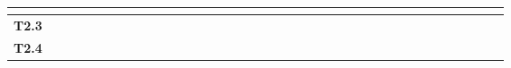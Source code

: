 \begin{table}[h]
{\begin{tabular}{|l|llllllllllll|llllllllllll|llllllllllll|}
  \multicolumn{1}{l|}{\cellcolor[HTML]{FBD4B4}} &
  \multicolumn{1}{l|}{\cellcolor[HTML]{FBD4B4}} &
  \multicolumn{1}{l|}{\cellcolor[HTML]{FBD4B4}} &
  \multicolumn{1}{l|}{\cellcolor[HTML]{FBD4B4}} &
  \multicolumn{1}{l|}{\cellcolor[HTML]{FBD4B4}} &
  \multicolumn{1}{l|}{\cellcolor[HTML]{FBD4B4}} &
  \multicolumn{1}{l|}{\cellcolor[HTML]{FBD4B4}} &
  \multicolumn{1}{l|}{\cellcolor[HTML]{FBD4B4}} &
  \multicolumn{1}{l|}{\cellcolor[HTML]{FBD4B4}} &
  \multicolumn{1}{l|}{\cellcolor[HTML]{FBD4B4}} &
  \multicolumn{1}{l|}{\cellcolor[HTML]{FBD4B4}} &
  \multicolumn{1}{l|}{} &
  \multicolumn{1}{l|}{} &
  \multicolumn{1}{l|}{} &
  \multicolumn{1}{l|}{} &
  \multicolumn{1}{l|}{} &
  \multicolumn{1}{l|}{} &
  \multicolumn{1}{l|}{} &
  \multicolumn{1}{l|}{} &
  \multicolumn{1}{l|}{} &
  \multicolumn{1}{l|}{} &
  \multicolumn{1}{l|}{} &
  \multicolumn{1}{l|}{} 
   \\ \hline
\textbf{T2.3} &
  \multicolumn{1}{l|}{} &
  \multicolumn{1}{l|}{} &
  \multicolumn{1}{l|}{} &
  \multicolumn{1}{l|}{} &
  \multicolumn{1}{l|}{} &
  \multicolumn{1}{l|}{} &
  \multicolumn{1}{l|}{} &
  \multicolumn{1}{l|}{} &
  \multicolumn{1}{l|}{} &
  \multicolumn{1}{l|}{} &
  \multicolumn{1}{l|}{} &
  \multicolumn{1}{l|}{} &
  \multicolumn{1}{l|}{} &
  \multicolumn{1}{l|}{} &
  \multicolumn{1}{l|}{} &
  \multicolumn{1}{l|}{} &
  \multicolumn{1}{l|}{} &
  \multicolumn{1}{l|}{} &
  \multicolumn{1}{l|}{} &
  \multicolumn{1}{l|}{} &
  \multicolumn{1}{l|}{} &
  \multicolumn{1}{l|}{} &
  \multicolumn{1}{l|}{} &
  \multicolumn{1}{l|}{} &
  \multicolumn{1}{l|}{\cellcolor[HTML]{FBD4B4}} &
  \multicolumn{1}{l|}{\cellcolor[HTML]{FBD4B4}} &
  \multicolumn{1}{l|}{\cellcolor[HTML]{FBD4B4}} &
  \multicolumn{1}{l|}{\cellcolor[HTML]{FBD4B4}} &
  \multicolumn{1}{l|}{\cellcolor[HTML]{FBD4B4}} &
  \multicolumn{1}{l|}{\cellcolor[HTML]{FBD4B4}} &
  \multicolumn{1}{l|}{\cellcolor[HTML]{FBD4B4}} &
  \multicolumn{1}{l|}{\cellcolor[HTML]{FBD4B4}} &
  \multicolumn{1}{l|}{\cellcolor[HTML]{FBD4B4}} &
  \multicolumn{1}{l|}{} &
  \multicolumn{1}{l|}{} &
  \multicolumn{1}{l|}{} 
   \\ \hline
\textbf{T2.4} &
  \multicolumn{1}{l|}{} &
  \multicolumn{1}{l|}{} &
  \multicolumn{1}{l|}{} &
  \multicolumn{1}{l|}{} &
  \multicolumn{1}{l|}{} &
  \multicolumn{1}{l|}{} &
  \multicolumn{1}{l|}{} &
  \multicolumn{1}{l|}{} &
  \multicolumn{1}{l|}{} &
  \multicolumn{1}{l|}{} &
  \multicolumn{1}{l|}{} &
  \multicolumn{1}{l|}{} &
  \multicolumn{1}{l|}{} &
  \multicolumn{1}{l|}{} &
  \multicolumn{1}{l|}{} &
  \multicolumn{1}{l|}{} &
  \multicolumn{1}{l|}{} &

\end{tabular}}
\end{table}
